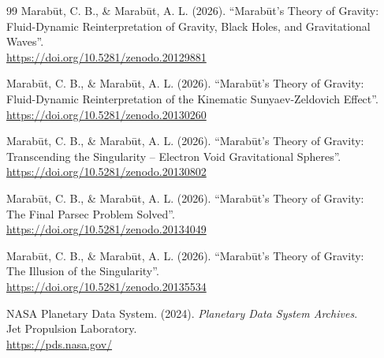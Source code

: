 \documentclass[11pt, a4paper, table]{article}
\begin{document}
\begin{thebibliography}{99}
  Marab\={u}t, C. B., \& Marab\={u}t, A. L. (2026). ``Marab\={u}t's Theory of Gravity: \\
  Fluid-Dynamic Reinterpretation of Gravity, Black Holes, and Gravitational Waves''. \\ \url{https://doi.org/10.5281/zenodo.20129881}

  Marab\={u}t, C. B., \& Marab\={u}t, A. L. (2026). ``Marab\={u}t's Theory of Gravity: \\
  Fluid-Dynamic Reinterpretation of the Kinematic Sunyaev-Zeldovich Effect''. \\
  \url{https://doi.org/10.5281/zenodo.20130260}

  Marab\={u}t, C. B., \& Marab\={u}t, A. L. (2026). ``Marab\={u}t's Theory of Gravity: \\
  Transcending the Singularity -- Electron Void Gravitational Spheres''. \\
  \url{https://doi.org/10.5281/zenodo.20130802}

  Marab\={u}t, C. B., \& Marab\={u}t, A. L. (2026). ``Marab\={u}t's Theory of Gravity: \\
  The Final Parsec Problem Solved''. \\
  \url{https://doi.org/10.5281/zenodo.20134049}

  Marab\={u}t, C. B., \& Marab\={u}t, A. L. (2026). ``Marab\={u}t's Theory of Gravity: \\
  The Illusion of the Singularity''. \\
  \url{https://doi.org/10.5281/zenodo.20135534}

   NASA Planetary Data System. (2024). \textit{Planetary Data System Archives}. \\
  Jet Propulsion Laboratory. \\
  \url{https://pds.nasa.gov/}
\end{thebibliography}
\end{document}
